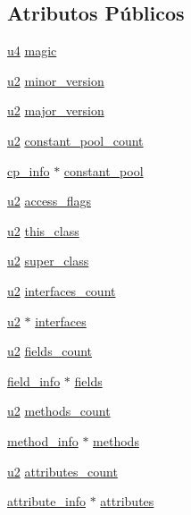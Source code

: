 \subsection*{Atributos Públicos}
\begin{DoxyCompactItemize}
\item 
\hyperlink{BasicTypes_8h_ae5be1f726785414dd1b77d60df074c9d}{u4} \hyperlink{classClassFile_a09085e9db513dae2f46da6e0a26c1b59}{magic}
\item 
\hyperlink{BasicTypes_8h_a732cde1300aafb73b0ea6c2558a7a54f}{u2} \hyperlink{classClassFile_af0db7b0ea01cb9cea2cee177ca81df09}{minor\+\_\+version}
\item 
\hyperlink{BasicTypes_8h_a732cde1300aafb73b0ea6c2558a7a54f}{u2} \hyperlink{classClassFile_abede9cb937e65072517d0ee6e26e2757}{major\+\_\+version}
\item 
\hyperlink{BasicTypes_8h_a732cde1300aafb73b0ea6c2558a7a54f}{u2} \hyperlink{classClassFile_ac8fdf5cccfd632da4fdb21ae63fffa7a}{constant\+\_\+pool\+\_\+count}
\item 
\hyperlink{structcp__info}{cp\+\_\+info} $\ast$ \hyperlink{classClassFile_a2309d843091aad79aed04ce92470a434}{constant\+\_\+pool}
\item 
\hyperlink{BasicTypes_8h_a732cde1300aafb73b0ea6c2558a7a54f}{u2} \hyperlink{classClassFile_ae88db578147f7ee0d6fc1aeacb341854}{access\+\_\+flags}
\item 
\hyperlink{BasicTypes_8h_a732cde1300aafb73b0ea6c2558a7a54f}{u2} \hyperlink{classClassFile_a2d33db0a560a71b94bc572dd1e4ec03a}{this\+\_\+class}
\item 
\hyperlink{BasicTypes_8h_a732cde1300aafb73b0ea6c2558a7a54f}{u2} \hyperlink{classClassFile_a5f6c11c0ccb02fd992b5c102725253ec}{super\+\_\+class}
\item 
\hyperlink{BasicTypes_8h_a732cde1300aafb73b0ea6c2558a7a54f}{u2} \hyperlink{classClassFile_a337fcb7da33d1b64631441115c7de305}{interfaces\+\_\+count}
\item 
\hyperlink{BasicTypes_8h_a732cde1300aafb73b0ea6c2558a7a54f}{u2} $\ast$ \hyperlink{classClassFile_af599de97e062c98966470f1590496425}{interfaces}
\item 
\hyperlink{BasicTypes_8h_a732cde1300aafb73b0ea6c2558a7a54f}{u2} \hyperlink{classClassFile_acea207ee523fbc16611d3cf436c390e0}{fields\+\_\+count}
\item 
\hyperlink{structfield__info}{field\+\_\+info} $\ast$ \hyperlink{classClassFile_aa324f88c75aa96c632f8c57d010aab0c}{fields}
\item 
\hyperlink{BasicTypes_8h_a732cde1300aafb73b0ea6c2558a7a54f}{u2} \hyperlink{classClassFile_aacfb45d4af64216324b1ae5269c870d5}{methods\+\_\+count}
\item 
\hyperlink{structmethod__info}{method\+\_\+info} $\ast$ \hyperlink{classClassFile_ad061f06cd709d10dbfbf82f443e43632}{methods}
\item 
\hyperlink{BasicTypes_8h_a732cde1300aafb73b0ea6c2558a7a54f}{u2} \hyperlink{classClassFile_a633c696fbe08e7e7906b2ab1e52f3d1b}{attributes\+\_\+count}
\item 
\hyperlink{structattribute__info}{attribute\+\_\+info} $\ast$ \hyperlink{classClassFile_a8bf809db8e1008f401dc3cda5e9cdb14}{attributes}
\end{DoxyCompactItemize}


